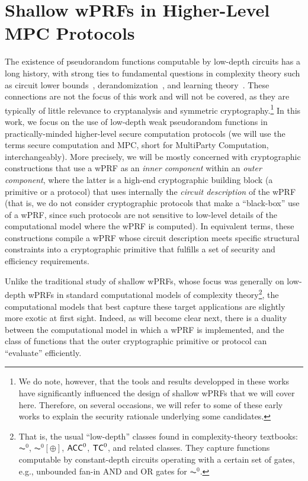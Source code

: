 
\section{Shallow wPRFs in Higher-Level MPC Protocols}
\label{sec:applications}


The existence of pseudorandom functions computable by low-depth circuits has a long history, with strong ties to fundamental questions in complexity theory such as circuit lower bounds~\cite{STOC:RazRud94,C:MilVio12,SerVio12}, derandomization~\cite{FOCS:NisWig88,STOC:Williams13}, and learning theory~\cite{valiant1984theory,kearns1994cryptographic,C:BCGIKS21}. These connections are not the focus of this work and will not be covered, as they are typically of little relevance to cryptanalysis and symmetric cryptography.\footnote{We do note, however, that the tools and results developped in these works have significantly influenced the design of shallow wPRFs that we will cover here. Therefore, on several occasions, we will refer to some of these early works to explain the security rationale underlying some candidates.} In this work, we focus on the use of low-depth weak pseudorandom functions in practically-minded higher-level secure computation protocols (we will use the terms secure computation and MPC, short for MultiParty Computation, interchangeably). More precisely, we will be mostly concerned with cryptographic constructions that use a wPRF as an \emph{inner component} within an \emph{outer component}, where the latter is a high-end cryptographic building block (a primitive or a protocol) that uses internally the \emph{circuit description} of the wPRF (that is, we do not consider cryptographic protocols that make a ``black-box'' use of a wPRF, since such protocols are not sensitive to low-level details of the computational model where the wPRF is computed). In equivalent terms, these constructions compile a wPRF whose circuit description meets specific structural constraints into a cryptographic primitive that fulfills a set of security and efficiency requirements.


 Unlike the traditional study of shallow wPRFs, whose focus was generally on low-depth wPRFs in standard computational models of complexity theory\footnote{That is, the usual ``low-depth'' classes found in complexity-theory textbooks: $\AC^0$, $\AC^0[\oplus]$, $\mathsf{ACC}^0$, $\mathsf{TC}^0$, and related classes. They capture functions computable by constant-depth circuits operating with a certain set of gates, e.g., unbounded fan-in AND and OR gates for $\AC^0$.},  the computational models that best capture these target applications are slightly more exotic at first sight. Indeed, as will become clear next, there is a duality between the computational model in which a wPRF is implemented, and the class of functions that the outer cryptographic primitive or protocol can ``evaluate'' efficiently.

